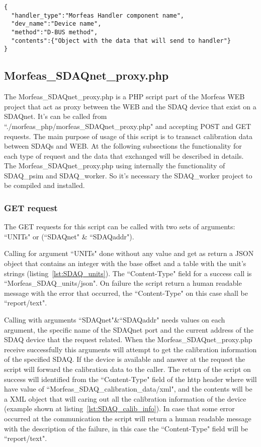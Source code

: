 \begin{lstlisting}[frame=single,caption=Structure of contents for POST request for Morfeas\_dbus\_proxy.php,label=lst:dbus_proxy]
{
  "handler_type":"Morfeas Handler component name",
  "dev_name":"Device name",
  "method":"D-BUS method",
  "contents":{"Object with the data that will send to handler"}
}
\end{lstlisting}

\subsection{Morfeas\_SDAQnet\_proxy.php}
The Morfeas\_SDAQnet\_proxy.php is a PHP script part of the Morfeas WEB project that act as proxy between the WEB and the SDAQ device that exist on a SDAQnet.
It's can be called from ``./morfeas\_php/morfeas\_SDAQnet\_proxy.php" and accepting POST and GET requests.
The main purpose of usage of this script is to transact calibration data between SDAQs and WEB.
At the following subsections the functionality for each type of request and the data that exchanged will be described in details.\\

The Morfeas\_SDAQnet\_proxy.php using internally the functionality of SDAQ\_psim and SDAQ\_worker. So it's necessary the SDAQ\_worker project to be compiled and installed.

\subsubsection{GET request}
The GET requests for this script can be called with two sets of arguments: ``UNITs" or (``SDAQnet" \& ``SDAQaddr").

Calling for argument ``UNITs" done without any value and get as return a JSON object that contains an integer with the base offset and
a table with the unit's strings (listing~\ref{lst:SDAQ_units}). The ``Content-Type" field for a success call is ``Morfeas\_SDAQ\_units/json".
On failure the script return a human readable message with the error that occurred, the ``Content-Type" on this case shall be ``report/text".

Calling with arguments ``SDAQnet"\&``SDAQaddr" needs values on each argument, the specific name of the SDAQnet port and the current address of the SDAQ device that the request related.
When the Morfeas\_SDAQnet\_proxy.php receive successfully this arguments will attempt to get the calibration information of the specified SDAQ.
If the device is available and answer at the request the script will forward the calibration data to the caller.
The return of the script on success will identified from the ``Content-Type" field of the http header where will have value of ``Morfeas\_SDAQ\_calibration\_data/xml",
and the contents will be a XML object that will caring out all the calibration information of the device (example shown at listing~\ref{lst:SDAQ_calib_info}).
In case that some error occurred at the communication the script will return a human readable message with the description of the failure,
in this case the ``Content-Type" field will be ``report/text".

